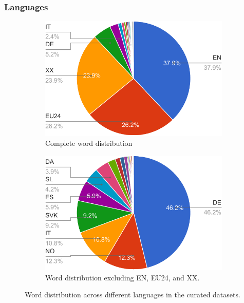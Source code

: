 \subsubsection{Languages}
\begin{figure}
\centering
\begin{subfigure}{.5\textwidth}
  \centering
  \includegraphics[width=0.95\linewidth]{images/Analysis/curated_lang_words_main.pdf}
  \caption{Complete word distribution} 
  \label{fig:curated_lang_word_a}
\end{subfigure}%
\begin{subfigure}{.5\textwidth}
  \centering
  \includegraphics[width=0.95\linewidth]{images/Analysis/curated_lang_words_sub.pdf}
\caption{Word distribution excluding EN, EU24, and XX.}
\label{fig:curated_lang_word_b}
\end{subfigure}
 \caption{Word distribution across different languages in the curated datasets.}
\label{fig:curated_lang_word}
\end{figure}


